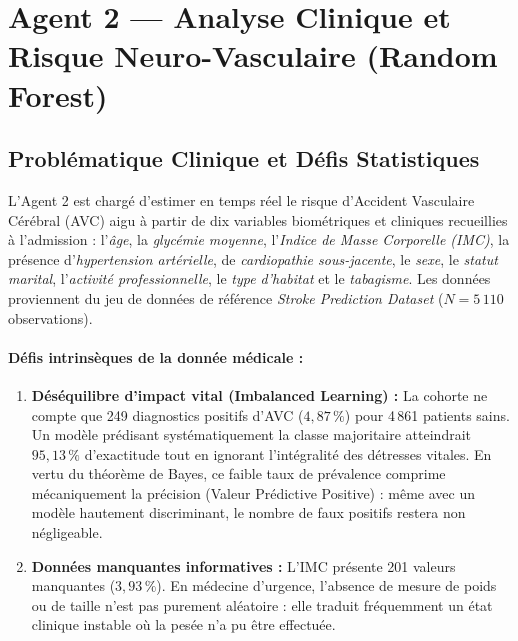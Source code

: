 
\section{Agent 2 --- Analyse Clinique et Risque Neuro-Vasculaire (Random Forest)}

\subsection{Problématique Clinique et Défis Statistiques}

L'Agent 2 est chargé d'estimer en temps réel le risque d'Accident Vasculaire Cérébral (AVC) aigu à partir de dix variables biométriques et cliniques recueillies à l'admission : l'\emph{âge}, la \emph{glycémie moyenne}, l'\emph{Indice de Masse Corporelle (IMC)}, la présence d'\emph{hypertension artérielle}, de \emph{cardiopathie sous-jacente}, le \emph{sexe}, le \emph{statut marital}, l'\emph{activité professionnelle}, le \emph{type d'habitat} et le \emph{tabagisme}. Les données proviennent du jeu de données de référence \emph{Stroke Prediction Dataset} ($N = 5\,110$ observations).

\paragraph{Défis intrinsèques de la donnée médicale :}
\begin{enumerate}
    \item \textbf{Déséquilibre d'impact vital (Imbalanced Learning) :} La cohorte ne compte que 249 diagnostics positifs d'AVC ($4{,}87\,\%$) pour 4\,861 patients sains. Un modèle prédisant systématiquement la classe majoritaire atteindrait $95{,}13\,\%$ d'exactitude tout en ignorant l'intégralité des détresses vitales. En vertu du théorème de Bayes, ce faible taux de prévalence comprime mécaniquement la précision (Valeur Prédictive Positive) : même avec un modèle hautement discriminant, le nombre de faux positifs restera non négligeable.
    \item \textbf{Données manquantes informatives :} L'IMC présente 201 valeurs manquantes ($3{,}93\,\%$). En médecine d'urgence, l'absence de mesure de poids ou de taille n'est pas purement aléatoire : elle traduit fréquemment un état clinique instable où la pesée n'a pu être effectuée.
\end{enumerate}

